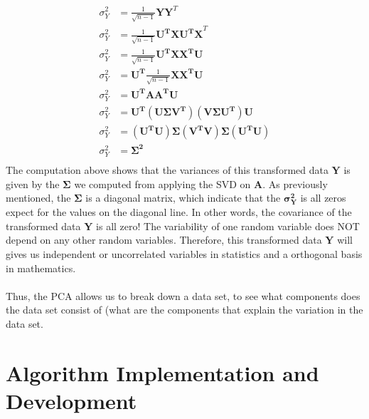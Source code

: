 \documentclass{article}
\begin{document}
\begin{equation}
    \begin{aligned}
        \sigma_Y^2 &= \frac{1}{\sqrt{n-1}}\mathbf{Y}\mathbf{Y}^T \\
        \sigma_Y^2 &= \frac{1}{\sqrt{n-1}}\mathbf{U^TX}\mathbf{U^TX}^T \\
        \sigma_Y^2 &= \frac{1}{\sqrt{n-1}}\mathbf{U^TXX^TU} \\
        \sigma_Y^2 &= \mathbf{U^T}\frac{1}{\sqrt{n-1}}\mathbf{XX^TU} \\
        \sigma_Y^2 &= \mathbf{U^TAA^TU} \\
        \sigma_Y^2 &= \mathbf{U^T(U\Sigma V^T) (V\Sigma U^T)U} \\
        \sigma_Y^2 &= \mathbf{(U^TU)\Sigma (V^TV)\Sigma (U^TU)} \\
        \sigma_Y^2 &= \mathbf{\Sigma^2} \\
    \end{aligned}
\end{equation}
The computation above shows that the variances of this transformed data $\mathbf{Y}$ is given by the $\mathbf{\Sigma}$ we computed from applying the SVD on $\mathbf{A}$. As previously mentioned, the $\mathbf{\Sigma}$ is a diagonal matrix, which indicate that the $\mathbf{\sigma_Y^2}$ is all zeros expect for the values on the diagonal line. In other words, the covariance of the transformed data $\mathbf{Y}$ is all zero! The variability of one random variable does NOT depend on any other random variables. Therefore, this transformed data $\mathbf{Y}$ will gives us independent or uncorrelated variables in statistics and a orthogonal basis in mathematics. \\
~\\
Thus, the PCA allows us to break down a data set, to see what components does the data set consist of (what are the components that explain the variation in the data set.
\section{Algorithm Implementation and Development}
\end{document}
